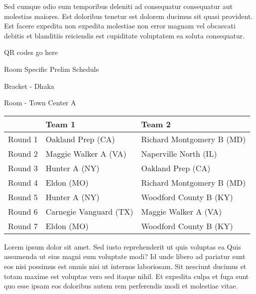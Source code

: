 \documentclass{article}%
\begin{document}
\newline%
Sed cumque odio eum temporibus deleniti ad consequatur consequatur aut molestias maiores. Est doloribus tenetur est dolorem ducimus sit quasi provident. Est facere expedita non expedita molestiae non error magnam vel obcaecati debitis et blanditiis reiciendis est cupiditate voluptatem ea soluta consequatur.%
\vspace*{140pt}%
\begin{center}%
\begin{Huge}%
QR codes go here%
\end{Huge}%
\end{center}%
\newpage%
\begin{center}%
\begin{Huge}%
Room Specific Prelim Schedule%
\end{Huge}%
\vspace*{8pt}%
\linebreak%
\begin{Large}%
Bracket {-} Dhaka%
\end{Large}%
\vspace*{8pt}%
\linebreak%
\vspace*{8pt}%
\begin{Large}%
Room {-} Town Center A%
\end{Large}%
\end{center}%
%
\begin{tabularx}{\textwidth}{|c|Y|Y|}%
\hline%
&Team 1&Team 2\\%
\hline%
Round 1&Oakland Prep (CA)&Richard Montgomery B (MD)\\%
Round 2&Maggie Walker A (VA)&Naperville North (IL)\\%
Round 3&Hunter A (NY)&Oakland Prep (CA)\\%
Round 4&Eldon (MO)&Richard Montgomery B (MD)\\%
Round 5&Hunter A (NY)&Woodford County B (KY)\\%
Round 6&Carnegie Vanguard (TX)&Maggie Walker A (VA)\\%
Round 7&Eldon (MO)&Woodford County B (KY)\\%
\hline%
\end{tabularx}%
\vspace*{8pt}%
\newline%
Lorem ipsum dolor sit amet. Sed iusto reprehenderit ut quis voluptas ea Quis assumenda ut eius magni eum voluptate modi? Id unde libero ad pariatur sunt eos nisi possimus est omnis nisi ut internos laboriosam. Sit nesciunt ducimus et totam maxime est voluptas vero sed itaque nihil. Et expedita culpa et fuga sunt quo esse ipsam eos doloribus autem rem perferendis modi et molestiae vitae.\newline%
\end{document}
